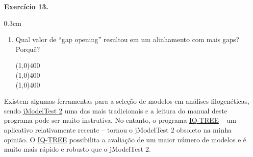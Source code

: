 \begin{refsection}
\begin{blackBlock}{\textbf{Exercício 13.}}
\end{blackBlock}

\begin {myindentpar}{0.3cm}
\begin{enumerate}[\itshape i.]
	\item{Qual valor de ``gap opening'' resultou em um alinhamento com mais gaps? Porquê?}

\begin{center}
\line(1,0){400}\\
\line(1,0){400}\\
\line(1,0){400}\\
\end{center}

\end{enumerate}
\end{myindentpar}

Existem algumas ferramentas para a seleção de modelos em análises filogenéticas, sendo \href{http://code.google.com/p/jmodeltest2/}{jModelTest 2} \parencite[][]{Darriba_et_al_2012,Guidon_and_Gascuel_2003} uma das mais tradicionais e a leitura do manual deste programa pode ser muito instrutiva. No entanto, o programa \href{http://www.iqtree.org/}{IQ-TREE} \parencite{Nguyen_et_al_2015} -- um aplicativo relativamente recente -- tornou o jModelTest 2 obsoleto na minha opinião. O \href{http://www.iqtree.org/}{IQ-TREE} possibilita a avaliação de um maior número de modelos e é muito mais rápido e robusto que o jModelTest 2.


\end{refsection}
